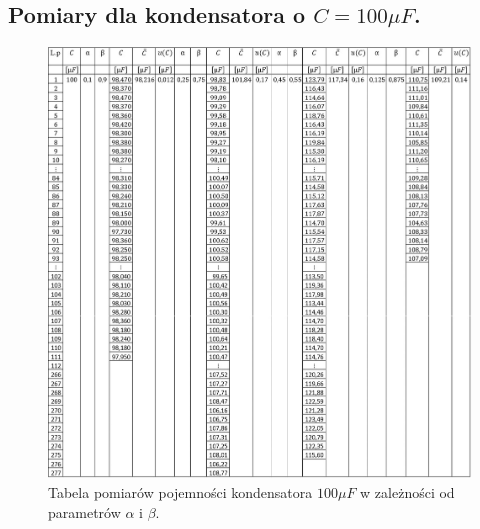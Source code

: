\documentclass[12pt]{mwart}
\begin{document}
	\subsection{Pomiary dla kondensatora o $C=100\mu F$.}
	\begin{figure}[H]
		\centering
		\includegraphics[width=1\linewidth, height=.92\textheight]{data/100_tab.jpg}
		\caption{Tabela pomiarów pojemności kondensatora $100\mu F$ w zależności od parametrów $\alpha$ i $\beta$.}
	\end{figure}
\end{document}

